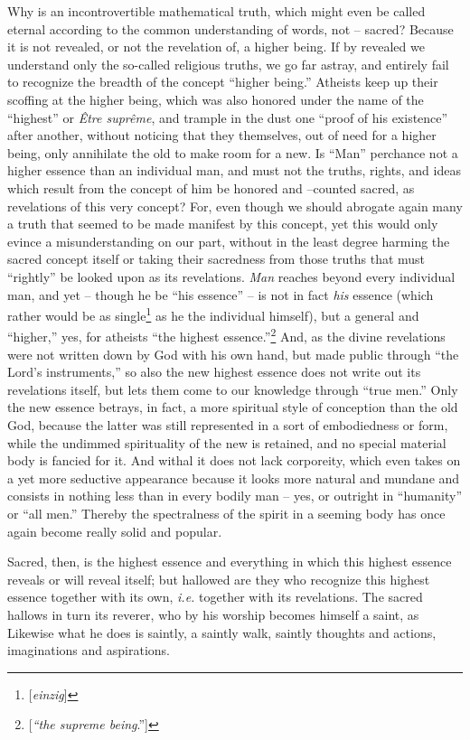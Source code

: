 Why is an incontrovertible mathematical truth, which might even be called 
eternal according to the common understanding of words, not -- sacred? Because 
it is not revealed, or not the revelation of, a higher being. If by revealed 
we understand only the so-called religious truths, we go far astray, and 
entirely fail to recognize the breadth of the concept ``higher being.'' 
Atheists keep up their scoffing at the higher being, which was also honored 
under the name of the ``highest'' or \textit{\^Etre supr\^eme}, and trample 
in the dust one ``proof of his existence'' after another, without noticing 
that they themselves, out of need for a higher being, only annihilate the old 
to make room for a new. Is ``Man'' perchance not a higher essence than an 
individual man, and must not the truths, rights, and ideas which result from 
the concept of him be honored and --counted sacred, as revelations of this 
very concept? For, even though we should abrogate again many a truth that 
seemed to be made manifest by this concept, yet this would only evince a 
misunderstanding on our part, without in the least degree harming the sacred 
concept itself or taking their sacredness from those truths that must 
``rightly'' be looked upon as its revelations. \textit{Man} reaches beyond 
every individual man, and yet -- though he be ``his essence'' -- is not in 
fact \textit{his} essence (which rather would be as 
single\footnote{[\textit{einzig}]} as he the individual himself), but a 
general and ``higher,'' yes, for atheists ``the highest 
essence.''\footnote{[\textit{``the supreme being}.'']} And, as the divine 
revelations were not written down by God with his own hand, but made public 
through ``the Lord's instruments,'' so also the new highest essence does not 
write out its revelations itself, but lets them come to our knowledge through 
``true men.'' Only the new essence betrays, in fact, a more spiritual style 
of conception than the old God, because the latter was still represented in a 
sort of embodiedness or form, while the undimmed spirituality of the new is 
retained, and no special material body is fancied for it. And withal it does 
not lack corporeity, which even takes on a yet more seductive appearance 
because it looks more natural and mundane and consists in nothing less than in 
every bodily man -- yes, or outright in ``humanity'' or ``all men.'' 
Thereby the spectralness of the spirit in a seeming body has once again become 
really solid and popular.

Sacred, then, is the highest essence and everything in which this highest 
essence reveals or will reveal itself; but hallowed are they who recognize 
this highest essence together with its own, \textit{i.e.} together with its 
revelations. The sacred hallows in turn its reverer, who by his worship 
becomes himself a saint, as Likewise what he does is saintly, a saintly walk, 
saintly thoughts and actions, imaginations and aspirations.

